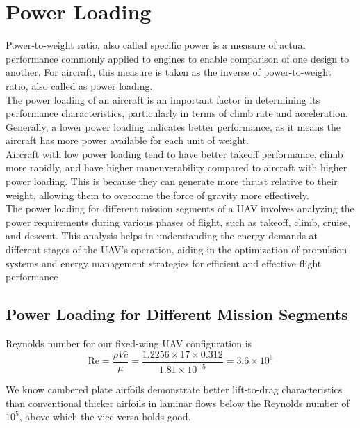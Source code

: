 \documentclass[12 pt]{article}
\begin{document}
\section{{Power Loading}}
Power-to-weight ratio, also called specific power is a measure of actual performance commonly applied to engines to enable comparison of one design to another. For aircraft, this measure is taken as the inverse of power-to-weight ratio, also called as power loading.\\
 
The power loading of an aircraft is an important factor in determining its performance characteristics, particularly in terms of climb rate and acceleration. Generally, a lower power loading indicates better performance, as it means the aircraft has more power available for each unit of weight.\\

Aircraft with low power loading tend to have better takeoff performance, climb more rapidly, and have higher maneuverability compared to aircraft with higher power loading. This is because they can generate more thrust relative to their weight, allowing them to overcome the force of gravity more effectively.\\

The power loading for different mission segments of a UAV involves analyzing the power requirements during various phases of flight, such as takeoff, climb, cruise, and descent. This analysis helps in understanding the energy demands at different stages of the UAV's operation, aiding in the optimization of propulsion systems and energy management strategies for efficient and effective flight performance

\subsection{{Power Loading for Different Mission Segments}}


Reynolds number for our fixed-wing UAV configuration is\begin{equation} 
\text{Re} = \frac{\rho V \bar{c}}{\mu} = \frac{1.2256 \times 17 \times 0.312}{1.81 \times 10^{-5}} = 3.6 \times 10^6 
\tag{3.10}
\end{equation}

We know cambered plate airfoils demonstrate better lift-to-drag characteristics than conventional thicker airfoils in laminar flows below the Reynolds number of ${10^5}$, above which the vice versa holds good.\\
\end{document}
